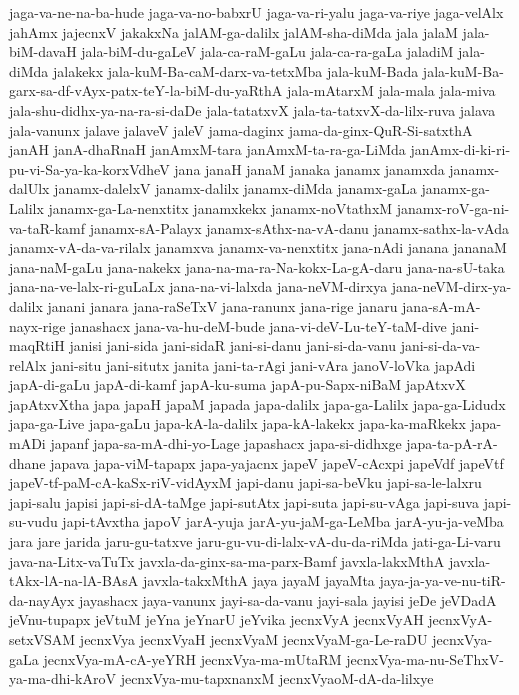 {jaga-va-ne-na-ba-hude
jaga-va-no-babxrU
jaga-va-ri-yalu
jaga-va-riye
jaga-velAlx
jahAmx
jajecnxV
jakakxNa
jalAM-ga-dalilx
jalAM-sha-diMda
jala
jalaM
jala-biM-davaH
jala-biM-du-gaLeV
jala-ca-raM-gaLu
jala-ca-ra-gaLa
jaladiM
jala-diMda
jalakekx
jala-kuM-Ba-caM-darx-va-tetxMba
jala-kuM-Bada
jala-kuM-Ba-garx-sa-df-vAyx-patx-teY-la-biM-du-yaRthA
jala-mAtarxM
jala-mala
jala-miva
jala-shu-didhx-ya-na-ra-si-daDe
jala-tatatxvX
jala-ta-tatxvX-da-lilx-ruva
jalava
jala-vanunx
jalave
jalaveV
jaleV
jama-daginx
jama-da-ginx-QuR-Si-satxthA
janAH
janA-dhaRnaH
janAmxM-tara
janAmxM-ta-ra-ga-LiMda
janAmx-di-ki-ri-pu-vi-Sa-ya-ka-korxVdheV
jana
janaH
janaM
janaka
janamx
janamxda
janamx-dalUlx
janamx-dalelxV
janamx-dalilx
janamx-diMda
janamx-gaLa
janamx-ga-Lalilx
janamx-ga-La-nenxtitx
janamxkekx
janamx-noVtathxM
janamx-roV-ga-ni-va-taR-kamf
janamx-sA-Palayx
janamx-sAthx-na-vA-danu
janamx-sathx-la-vAda
janamx-vA-da-va-rilalx
janamxva
janamx-va-nenxtitx
jana-nAdi
janana
jananaM
jana-naM-gaLu
jana-nakekx
jana-na-ma-ra-Na-kokx-La-gA-daru
jana-na-sU-taka
jana-na-ve-lalx-ri-guLaLx
jana-na-vi-lalxda
jana-neVM-dirxya
jana-neVM-dirx-ya-dalilx
janani
janara
jana-raSeTxV
jana-ranunx
jana-rige
janaru
jana-sA-mA-nayx-rige
janashacx
jana-va-hu-deM-bude
jana-vi-deV-Lu-teY-taM-dive
jani-maqRtiH
janisi
jani-sida
jani-sidaR
jani-si-danu
jani-si-da-vanu
jani-si-da-va-relAlx
jani-situ
jani-situtx
janita
jani-ta-rAgi
jani-vAra
janoV-loVka
japAdi
japA-di-gaLu
japA-di-kamf
japA-ku-suma
japA-pu-Sapx-niBaM
japAtxvX
japAtxvXtha
japa
japaH
japaM
japada
japa-dalilx
japa-ga-Lalilx
japa-ga-Lidudx
japa-ga-Live
japa-gaLu
japa-kA-la-dalilx
japa-kA-lakekx
japa-ka-maRkekx
japa-mADi
japanf
japa-sa-mA-dhi-yo-Lage
japashacx
japa-si-didhxge
japa-ta-pA-rA-dhane
japava
japa-viM-tapapx
japa-yajacnx
japeV
japeV-cAcxpi
japeVdf
japeVtf
japeV-tf-paM-cA-kaSx-riV-vidAyxM
japi-danu
japi-sa-beVku
japi-sa-le-lalxru
japi-salu
japisi
japi-si-dA-taMge
japi-sutAtx
japi-suta
japi-su-vAga
japi-suva
japi-su-vudu
japi-tAvxtha
japoV
jarA-yuja
jarA-yu-jaM-ga-LeMba
jarA-yu-ja-veMba
jara
jare
jarida
jaru-gu-tatxve
jaru-gu-vu-di-lalx-vA-du-da-riMda
jati-ga-Li-varu
java-na-Litx-vaTuTx
javxla-da-ginx-sa-ma-parx-Bamf
javxla-lakxMthA
javxla-tAkx-lA-na-lA-BAsA
javxla-takxMthA
jaya
jayaM
jayaMta
jaya-ja-ya-ve-nu-tiR-da-nayAyx
jayashacx
jaya-vanunx
jayi-sa-da-vanu
jayi-sala
jayisi
jeDe
jeVDadA
jeVnu-tupapx
jeVtuM
jeYna
jeYnarU
jeYvika
jecnxVyA
jecnxVyAH
jecnxVyA-setxVSAM
jecnxVya
jecnxVyaH
jecnxVyaM
jecnxVyaM-ga-Le-raDU
jecnxVya-gaLa
jecnxVya-mA-cA-yeYRH
jecnxVya-ma-mUtaRM
jecnxVya-ma-nu-SeThxV-ya-ma-dhi-kAroV
jecnxVya-mu-tapxnanxM
jecnxVyaoM-dA-da-lilxye
}
